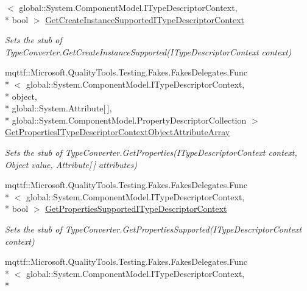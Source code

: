 \begin{DoxyCompactItemize}
$<$ global\-::\-System.\-Component\-Model.\-I\-Type\-Descriptor\-Context, \\*
bool $>$ \hyperlink{class_system_1_1_component_model_1_1_fakes_1_1_stub_enum_converter_afc5d6ec5b83f7066b13c6581a18805ee}{Get\-Create\-Instance\-Supported\-I\-Type\-Descriptor\-Context}
\begin{DoxyCompactList}\small\item\em Sets the stub of Type\-Converter.\-Get\-Create\-Instance\-Supported(\-I\-Type\-Descriptor\-Context context)\end{DoxyCompactList}\item 
mqttf\-::\-Microsoft.\-Quality\-Tools.\-Testing.\-Fakes.\-Fakes\-Delegates.\-Func\\*
$<$ global\-::\-System.\-Component\-Model.\-I\-Type\-Descriptor\-Context, \\*
object, \\*
global\-::\-System.\-Attribute\mbox{[}$\,$\mbox{]}, \\*
global\-::\-System.\-Component\-Model.\-Property\-Descriptor\-Collection $>$ \hyperlink{class_system_1_1_component_model_1_1_fakes_1_1_stub_enum_converter_ac57166f5b62ae4f61952d9d3d60bb5dd}{Get\-Properties\-I\-Type\-Descriptor\-Context\-Object\-Attribute\-Array}
\begin{DoxyCompactList}\small\item\em Sets the stub of Type\-Converter.\-Get\-Properties(\-I\-Type\-Descriptor\-Context context, Object value, Attribute\mbox{[}$\,$\mbox{]} attributes)\end{DoxyCompactList}\item 
mqttf\-::\-Microsoft.\-Quality\-Tools.\-Testing.\-Fakes.\-Fakes\-Delegates.\-Func\\*
$<$ global\-::\-System.\-Component\-Model.\-I\-Type\-Descriptor\-Context, \\*
bool $>$ \hyperlink{class_system_1_1_component_model_1_1_fakes_1_1_stub_enum_converter_abf78ea2252643dd04b637536b9a925ab}{Get\-Properties\-Supported\-I\-Type\-Descriptor\-Context}
\begin{DoxyCompactList}\small\item\em Sets the stub of Type\-Converter.\-Get\-Properties\-Supported(\-I\-Type\-Descriptor\-Context context)\end{DoxyCompactList}\item 
mqttf\-::\-Microsoft.\-Quality\-Tools.\-Testing.\-Fakes.\-Fakes\-Delegates.\-Func\\*
$<$ global\-::\-System.\-Component\-Model.\-I\-Type\-Descriptor\-Context, \\*

\end{DoxyCompactItemize}
